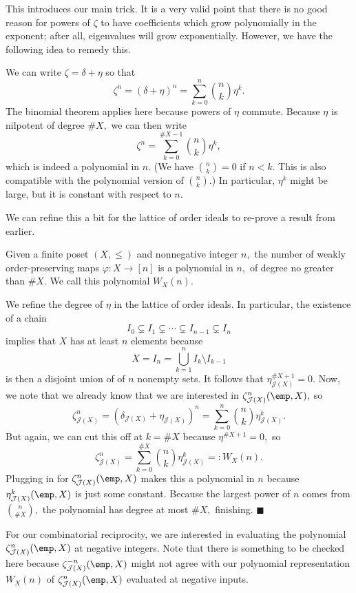 This introduces our main trick. It is a very valid point that there is no good reason for powers of $\zeta$ to have coefficients which grow polynomially in the exponent; after all, eigenvalues will grow exponentially. However, we have the following idea to remedy this.
\begin{idea}
    We can write $\zeta=\delta+\eta$ so that
    \[\zeta^n=(\delta+\eta)^n=\sum_{k=0}^n\binom nk\eta^k.\]
    The binomial theorem applies here because powers of $\eta$ commute. Because $\eta$ is nilpotent of degree $\#X,$ we can then write
    \[\zeta^n=\sum_{k=0}^{\#X-1}\binom nk\eta^k,\]
    which is indeed a polynomial in $n.$ (We have $\binom nk=0$ if $n<k.$ This is also compatible with the polynomial version of $\binom nk.$) In particular, $\eta^k$ might be large, but it is constant with respect to $n.$
\end{idea}

We can refine this a bit for the lattice of order ideals to re-prove a result from earlier.
\begin{proposition}
    Given a finite poset $(X,\le)$ and nonnegative integer $n,$ the number of weakly order-preserving maps $\varphi:X\to[n]$ is a polynomial in $n,$ of degree no greater than $\#X.$ We call this polynomial $W_X(n).$
\end{proposition}
We refine the degree of $\eta$ in the lattice of order ideals. In particular, the existence of a chain
\[I_0\subsetneq I_1\subsetneq\cdots\subsetneq I_{n-1}\subsetneq I_n\]
implies that $X$ has at least $n$ elements because
\[X=I_n=\bigcup_{k=1}^nI_k\setminus I_{k-1}\]
is then a disjoint union of of $n$ nonempty sets. It follows that $\eta_{\mathcal J(X)}^{\#X+1}=0.$ Now, we note that we already know that we are interested in $\zeta_{\mathcal J(X)}^n(\emp,X),$ so
\[\zeta_{\mathcal J(X)}^n=\left(\delta_{\mathcal J(X)}+\eta_{\mathcal J(X)}\right)^n=\sum_{k=0}^n\binom nk\eta_{\mathcal J(X)}^k.\]
But again, we can cut this off at $k=\#X$ because $\eta^{\#X+1}=0,$ so
\[\zeta_{\mathcal J(X)}^n=\sum_{k=0}^{\#X}\binom nk\eta_{\mathcal J(X)}^k=:W_X(n).\]
Plugging in for $\zeta_{\mathcal J(X)}^n(\emp,X)$ makes this a polynomial in $n$ because $\eta_{\mathcal J(X)}^k(\emp,X)$ is just some constant. Because the largest power of $n$ comes from $\binom n{\#X},$ the polynomial has degree at most $\#X,$ finishing. $\blacksquare$

For our combinatorial reciprocity, we are interested in evaluating the polynomial $\zeta^n_{\mathcal J(X)}(\emp,X)$ at negative integers. Note that there is something to be checked here because $\zeta^{-n}_{\mathcal J(X)}(\emp,X)$ might not agree with our polynomial representation $W_X(n)$ of $\zeta^n_{\mathcal J(X)}(\emp,X)$ evaluated at negative inputs.

